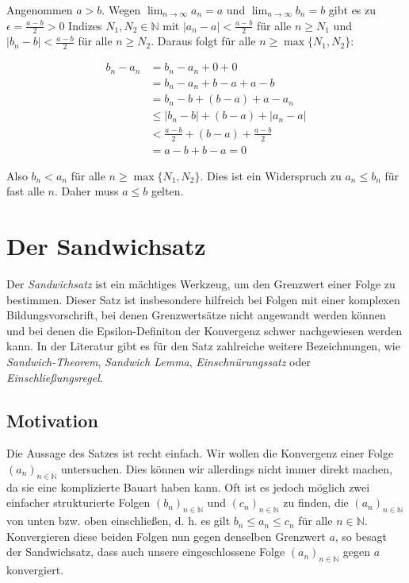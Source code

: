 \documentclass[fontsize=9pt,
               parskip=half-,
               DIV=14,
               listof=chapterentry,
               tocflat]{scrbook}
\begin{document}
\begin{proof*}
Angenommen $a>b$. Wegen $\lim _{n\to \infty }a_{n}=a$ und $\lim _{n\to \infty }b_{n}=b$ gibt es zu $\epsilon ={\tfrac {a-b}{2}}>0$ Indizes $N_{1},N_{2}\in \mathbb {N} $ mit $|a_{n}-a|<{\tfrac {a-b}{2}}$ für alle $n\geq N_{1}$ und $|b_{n}-b|<{\tfrac {a-b}{2}}$ für alle $n\geq N_{2}$. Daraus folgt für alle $n\geq \max\{N_{1},N_{2}\}$:

\begin{align*}
b_{n}-a_{n}&=b_{n}-a_{n}+0+0\\&=b_{n}-a_{n}+b-a+a-b\\&=b_{n}-b+(b-a)+a-a_{n}\\&\leq |b_{n}-b|+(b-a)+|a_{n}-a|\\&<{\tfrac {a-b}{2}}+(b-a)+{\tfrac {a-b}{2}}\\&=a-b+b-a=0
\end{align*}

Also $b_{n}<a_{n}$ für alle $n\geq \max\{N_{1},N_{2}\}$. Dies ist ein Widerspruch zu $a_{n}\leq b_{n}$ für fast alle $n$. Daher muss $a\leq b$ gelten.

\end{proof*}

\chapter{Der Sandwichsatz}

Der \emph{Sandwichsatz} ist ein mächtiges Werkzeug, um den Grenzwert einer Folge zu bestimmen. Dieser Satz ist insbesondere hilfreich bei Folgen mit einer komplexen Bildungsvorschrift, bei denen Grenzwertsätze nicht angewandt werden können und bei denen die Epsilon-Definiton der Konvergenz schwer nachgewiesen werden kann. In der Literatur gibt es für den Satz zahlreiche weitere Bezeichnungen, wie \emph{Sandwich-Theorem}, \emph{Sandwich Lemma}, \emph{Einschnürungssatz} oder \emph{Einschließungsregel}.

\section{Motivation}

Die Aussage des Satzes ist recht einfach. Wir wollen die Konvergenz einer Folge $(a_{n})_{n\in \mathbb {N} }$ untersuchen. Dies können wir allerdings nicht immer direkt machen, da sie eine komplizierte Bauart haben kann. Oft ist es jedoch möglich zwei einfacher strukturierte Folgen $(b_{n})_{n\in \mathbb {N} }$ und $(c_{n})_{n\in \mathbb {N} }$ zu finden, die $(a_{n})_{n\in \mathbb {N} }$ von unten bzw. oben einschließen, d. h. es gilt $b_{n}\leq a_{n}\leq c_{n}$ für alle $n\in \mathbb {N} $. Konvergieren diese beiden Folgen nun gegen denselben Grenzwert $a$, so besagt der Sandwichsatz, dass auch unsere eingeschlossene Folge $(a_{n})_{n\in \mathbb {N} }$ gegen $a$ konvergiert.
\end{document}
